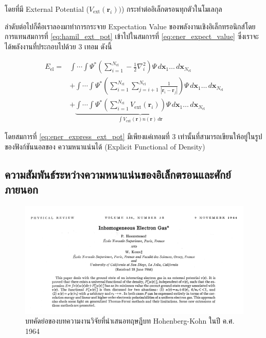 \noindent โดยที่มี External Potential ($V_{\text{ext}}(\bm{r}_{i}))$) กระทำต่ออิเล็กตรอนทุกตัวในโมเลกุล 

ลำดับต่อไปก็คือเราลองมาทำการกระจาย Expectation Value ของพลังงานเชิงอิเล็กทรอนิกส์โดยการแทนสมการที่ \ref{eq:hamil_ext_pot} 
เข้าไปในสมการที่ \ref{eq:ener_expect_value} ซึ่งเราจะได้พลังงานที่ประกอบไปด้วย 3 เทอม ดังนี้

\begin{align}\label{eq:ener_express_ext_pot}
    E_{\text{el}} =& \int \cdots \int \Psi^{\ast} 
    \left ( \sum^{N_{\text{el}}}_{i=1} -\frac{1}{2} \nabla^{2}_{i} \right ) 
    \Psi \, d\bm{x}_{1} \dots \, d\bm{x}_{N_{\text{el}}} \nonumber \\
    &+ \int \cdots \int \Psi^{\ast} 
    \left ( \sum^{N_{\text{el}}}_{i=1} \sum^{N_{\text{el}}}_{j=i+1} \frac{1}{|\bm{r}_{i}-\bm{r}_{j}|} \right ) 
    \Psi \, d\bm{x}_{1} \dots \, d\bm{x}_{N_{\text{el}}} \nonumber \\
    &+ \underbrace{\int \cdots \int \Psi^{\ast} 
    \left ( \sum^{N_{\text{el}}}_{i=1} V_{\text{ext}}(\bm{r}_{i}) \right ) 
    \Psi \, d\bm{x}_{1} \dots \, d\bm{x}_{N_{\text{el}}}%
    }_{\textstyle \int V_{\text{ext}}(\bm{r}) n(\bm{r}) \, d\bm{r}}
\end{align}

\noindent โดยสมการที่ \ref{eq:ener_express_ext_pot} มีเพียงแค่เทอมที่ 3 เท่านั้นที่สามารถเขียนให้อยู่ในรูปของฟังก์ชันนอลของ%
ความหนาแน่นได้ (Explicit Functional of Density)

\subsection{ความสัมพันธ์ระหว่างความหนาแน่นของอิเล็กตรอนและศักย์ภายนอก}
\label{ssec:ener_density_ext_pot}

\begin{figure}[H]
    \centering
    \includegraphics[width=0.9\linewidth]{fig/hohenberg_kohn_abstract.png}
    \caption{บทคัดย่อของบทความงานวิจัยที่นำเสนอทฤษฎีบท Hohenberg-Kohn ในปี ค.ศ. 1964}
    \label{fig:hohenberg_john_abs}
\end{figure}

